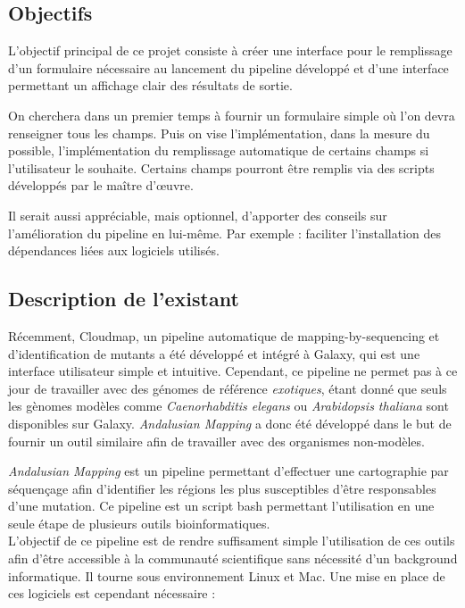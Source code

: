 \documentclass[12pt]{article}
\begin{document}
\subsection{Objectifs}

L’objectif principal de ce projet consiste à créer une interface pour le remplissage d'un formulaire nécessaire au lancement du pipeline développé et d'une interface permettant un affichage clair des résultats de sortie.

On cherchera dans un premier temps à fournir un formulaire simple où l'on devra renseigner tous les champs. Puis on vise l'implémentation, dans la mesure du possible, l'implémentation du remplissage automatique de certains champs si l'utilisateur le souhaite. Certains champs pourront être remplis via des scripts développés par le maître d’œuvre.

Il serait aussi appréciable, mais optionnel, d’apporter des conseils sur l’amélioration du pipeline en lui-même. Par exemple : faciliter l’installation des dépendances liées aux logiciels utilisés.

\subsection{Description de l'existant}

Récemment, Cloudmap, un pipeline automatique de mapping-by-sequencing et d'identification de mutants a été développé et intégré à Galaxy, qui est une interface utilisateur simple et intuitive.
Cependant, ce pipeline ne permet pas à ce jour de travailler avec des génomes de référence \textit{exotiques}, étant donné que seuls les gènomes modèles comme \textit{Caenorhabditis elegans} ou \textit{Arabidopsis thaliana} sont disponibles sur Galaxy.
\textit{Andalusian Mapping} a donc été développé dans le but de fournir un outil similaire afin de travailler avec des organismes non-modèles.

\textit{Andalusian Mapping} est un pipeline permettant d'effectuer une cartographie par séquençage afin d'identifier les régions les plus susceptibles d'être responsables d'une mutation.
Ce pipeline est un script bash permettant l'utilisation en une seule étape de plusieurs outils bioinformatiques. \\

L'objectif de ce pipeline est de rendre suffisament simple l'utilisation de ces outils afin d'être accessible à la communauté scientifique sans nécessité d'un background informatique. Il tourne sous environnement Linux et Mac.
Une mise en place de ces logiciels est cependant nécessaire :
\end{document}
